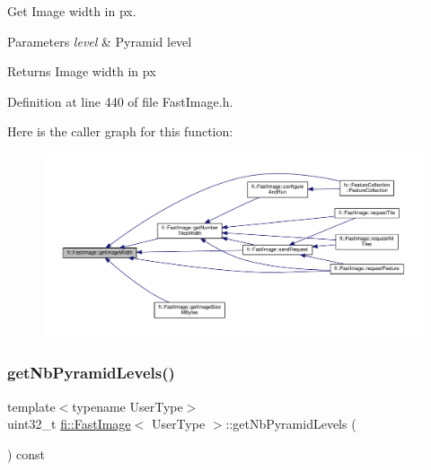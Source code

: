 Get Image width in px. 


\begin{DoxyParams}{Parameters}
{\em level} & Pyramid level \\
\hline
\end{DoxyParams}
\begin{DoxyReturn}{Returns}
Image width in px 
\end{DoxyReturn}


Definition at line 440 of file Fast\+Image.\+h.

Here is the caller graph for this function\+:
\nopagebreak
\begin{figure}[H]
\begin{center}
\leavevmode
\includegraphics[width=350pt]{dc/d6b/classfi_1_1FastImage_a1ea580c3c08fe5be5575f0007b1bafbe_icgraph}
\end{center}
\end{figure}
\mbox{\label{classfi_1_1FastImage_aaa3d1fe92e83a2e1568a7b66ecfd2d2a}} 
\subsubsection{\texorpdfstring{get\+Nb\+Pyramid\+Levels()}{getNbPyramidLevels()}}
{\footnotesize\ttfamily template$<$typename User\+Type$>$ \\
uint32\+\_\+t \hyperlink{classfi_1_1FastImage}{fi\+::\+Fast\+Image}$<$ User\+Type $>$\+::get\+Nb\+Pyramid\+Levels (\begin{DoxyParamCaption}{ }\end{DoxyParamCaption}) const\hspace{0.3cm}{\ttfamily [inline]}}



